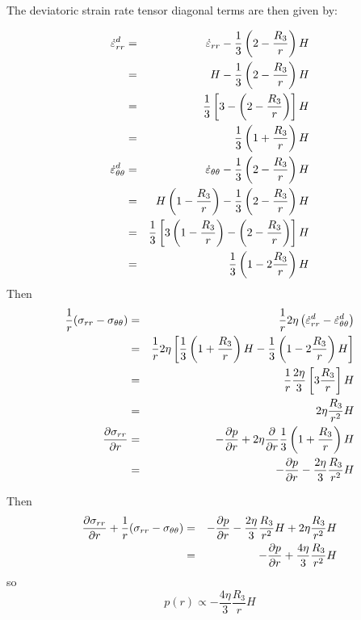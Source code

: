 The deviatoric strain rate tensor diagonal terms are then given by:

\begin{eqnarray}
\dot\varepsilon_{rr}^d  
&=& \dot\varepsilon_{rr}  -\frac13  \left(2-\frac{R_3}{r}\right)  H  \nonumber\\
&=& H  -\frac13  \left(2-\frac{R_3}{r}\right)  H \nonumber \\
&=& \frac13\left[ 3  -  \left(2-\frac{R_3}{r}\right) \right] H \nonumber \\
&=& \frac13\left( 1+ \frac{R_3}{r} \right) H  
\nonumber\\
\dot\varepsilon_{\theta\theta}^d  
&=& \dot\varepsilon_{\theta\theta}  -\frac13   \left(2-\frac{R_3}{r}\right)  H  \nonumber\\
&=&  H \left(1 - \frac{R_3}{r} \right)-\frac13   \left(2-\frac{R_3}{r}\right)  H  \nonumber\\
&=& \frac13  \left[  3\left(1 - \frac{R_3}{r} \right)-  \left(2-\frac{R_3}{r}\right)  \right] H \nonumber \\
&=& \frac13  \left(  1 - 2\frac{R_3}{r}  \right) H 
\end{eqnarray}
Then
\begin{eqnarray}
\frac{1}{r}( \sigma_{rr} - \sigma_{\theta\theta} )
&=& 
\frac{1}{r} 2\eta \left( \dot\varepsilon_{rr}^d   - \dot\varepsilon_{\theta\theta}^d  \right) \nonumber\\
&=& 
\frac{1}{r} 2\eta \left[
\frac13\left( 1+ \frac{R_3}{r} \right) H  
-
\frac13  \left(  1 - 2\frac{R_3}{r}  \right) H  
\right] \nonumber\\
&=& \frac{1}{r} \frac{2\eta}{3} \left[ 3\frac{R_3}{r}    \right] H  \nonumber\\
&=&  2\eta \frac{R_3}{r^2}   H  \nonumber\\
\frac{\partial \sigma_{rr}}{\partial r} 
&=&
- \frac{\partial p}{\partial r} 
+ 2\eta \frac{\partial }{\partial r}  \frac13\left( 1+ \frac{R_3}{r} \right) H  \nonumber\\
&=&
- \frac{\partial p}{\partial r} - \frac{2 \eta}{3} \frac{R_3}{r^2}   H  
\end{eqnarray}


Then
\begin{eqnarray}
\frac{\partial \sigma_{rr}}{\partial r} +\frac{1}{r}( \sigma_{rr} - \sigma_{\theta\theta} )
&=&
- \frac{\partial p}{\partial r} - \frac{2 \eta}{3} \frac{R_3}{r^2}   H  
+ 2\eta \frac{R_3}{r^2}   H  \nonumber\\
&=& - \frac{\partial p}{\partial r} + \frac{4 \eta}{3} \frac{R_3}{r^2}   H  
\end{eqnarray}
so 
\[
p(r) \propto -\frac{4 \eta}{3} \frac{R_3}{r}   H  
\]



